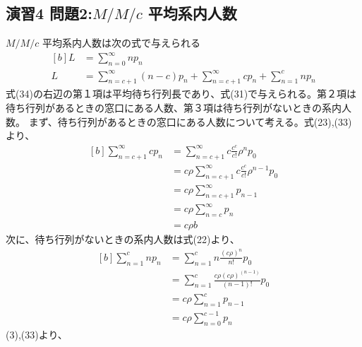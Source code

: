 \documentclass{report}
\begin{document}
\begin{CJK}{UTF8}{min}
    \section*{演習4 問題2:$M/M/c$ 平均系内人数}
    $M/M/c$ 平均系内人数は次の式で与えられる
    \begin{equation}
        \begin{aligned}[b]
            L & =\sum_{n=0}^{\infty}np_n                                                    \\
            L & =\sum_{n=c+1}^{\infty}(n-c)p_n+\sum_{n=c+1}^{\infty}cp_n+\sum_{n=1}^{c}np_n
        \end{aligned}
    \end{equation}
    式(34)の右辺の第１項は平均待ち行列長であり、式(31)で与えられる。第２項は待ち行列があるときの窓口にある人数、第３項は待ち行列がないときの系内人数。
    まず、待ち行列があるときの窓口にある人数について考える。式(23),(33)より、
    \begin{equation}
        \begin{aligned}[b]
            \sum_{n=c+1}^{\infty}cp_n & =\sum_{n=c+1}^{\infty}c\frac{c^c}{c!}\rho^np_0          \\
                                      & =c\rho\sum_{n=c+1}^{\infty}c\frac{c^c}{c!}\rho^{n-1}p_0 \\
                                      & =c\rho\sum_{n=c+1}^{\infty}p_{n-1}                      \\
                                      & =c\rho\sum_{n=c}^{\infty}p_n                            \\
                                      & =c\rho b
        \end{aligned}
    \end{equation}
    次に、待ち行列がないときの系内人数は式(22)より、
    \begin{equation}
        \begin{aligned}[b]
            \sum_{n=1}^{c}np_n & =\sum_{n=1}^{c}n\frac{(c\rho)^n}{n!}p_0               \\
                               & =\sum_{n=1}^{c}\frac{c\rho(c\rho)^{(n-1)}}{(n-1)!}p_0 \\
                               & =c\rho\sum_{n=1}^{c}p_{n-1}                           \\
                               & =c\rho\sum_{n=0}^{c-1}p_{n}
        \end{aligned}
    \end{equation}
    (3),(33)より、
    \begin{equation}

\end{equation}
\end{CJK}
\end{document}
